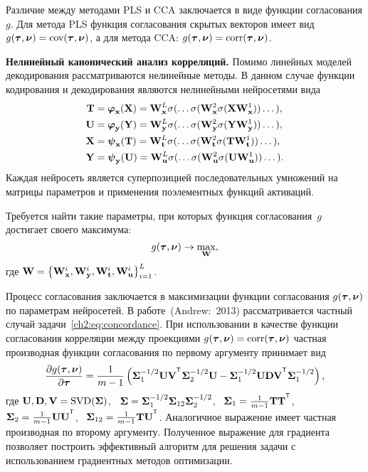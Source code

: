 \documentclass[11pt, a5paper]{dissert}
\begin{document}
Различие между методами PLS и CCA заключается в виде функции согласования $g$.
Для метода PLS функция согласования скрытых векторов имеет вид $g(\boldsymbol{\tau}, \boldsymbol{\nu}) = \text{cov}(\boldsymbol{\tau}, \boldsymbol{\nu})$, а для метода CCA: $g(\boldsymbol{\tau}, \boldsymbol{\nu}) = \text{corr}(\boldsymbol{\tau}, \boldsymbol{\nu})$.

\textbf{Нелинейный канонический анализ корреляций.}
Помимо линейных моделей декодирования рассматриваются нелинейные методы. 
В данном случае функции кодирования и декодирования являются нелинейными нейросетями вида
\begin{align*}
	\mathbf{T} &= \boldsymbol{\varphi}_{\mathbf{x}}(\mathbf{X}) =  \mathbf{W}_{\mathbf{x}}^L \sigma(\dots \sigma(\mathbf{W}_{\mathbf{x}}^2 \sigma(\mathbf{X} \mathbf{W}_{\mathbf{x}}^1)) \dots ), \\
	\mathbf{U} &= \boldsymbol{\varphi}_{\mathbf{y}}(\mathbf{Y}) =  \mathbf{W}_{\mathbf{y}}^L \sigma(\dots \sigma(\mathbf{W}_{\mathbf{y}}^2 \sigma(\mathbf{Y} \mathbf{W}_{\mathbf{y}}^1)) \dots ), \\
	\mathbf{X} &= \boldsymbol{\psi}_{\mathbf{x}}(\mathbf{T}) =  \mathbf{W}_{\mathbf{t}}^L \sigma(\dots \sigma(\mathbf{W}_{\mathbf{t}}^2 \sigma(\mathbf{T} \mathbf{W}_{\mathbf{t}}^1)) \dots ), \\
	\mathbf{Y} &= \boldsymbol{\psi}_{\mathbf{y}}(\mathbf{U}) =  \mathbf{W}_{\mathbf{u}}^L \sigma(\dots \sigma(\mathbf{W}_{\mathbf{u}}^2 \sigma(\mathbf{U} \mathbf{W}_{\mathbf{u}}^1)) \dots ).
\end{align*}
Каждая нейросеть является суперпозицией последовательных умножений на матрицы параметров и применения поэлементных функций активаций.

Требуется найти такие параметры, при которых функция согласования~$g$ достигает своего максимума:
\begin{equation}
	g(\boldsymbol{\tau}, \boldsymbol{\nu}) \rightarrow \max_{\mathbf{W}},
	\label{ch2:eq:concordance}
\end{equation}
где $\mathbf{W} = \bigl\{\mathbf{W}_{\mathbf{x}}^i, \mathbf{W}_{\mathbf{y}}^i, \mathbf{W}_{\mathbf{t}}^i, \mathbf{W}_{\mathbf{u}}^i\bigr\}_{i=1}^L$.

Процесс согласования заключается в максимизации функции согласования $g(\boldsymbol{\tau}, \boldsymbol{\nu})$ по параметрам нейросетей.
В работе~(Andrew:~2013) рассматривается частный случай задачи~\eqref{ch2:eq:concordance}. 
При использовании в качестве функции согласования корреляции между проекциями $g(\boldsymbol{\tau}, \boldsymbol{\nu}) = \textnormal{corr}(\boldsymbol{\tau}, \boldsymbol{\nu})$ частная производная функции согласования по первому аргументу принимает вид
\[
	\frac{\partial g(\btau, \bnu)}{\partial \btau} = \frac{1}{m - 1} \left(\bSigma_1^{-1/2} \bU \bV^{\T} \bSigma_2^{-1/2} \bU - \bSigma_1^{-1/2} \bU \bD \bV^{\T} \bSigma_1^{-1/2} \right),
\]
где $\mathbf{U}, \mathbf{D}, \mathbf{V} = \textnormal{SVD}(\boldsymbol{\Sigma})$, \, $\boldsymbol{\Sigma} = \boldsymbol{\Sigma}_1^{-1/2} \boldsymbol{\Sigma}_{12} \boldsymbol{\Sigma}_2^{-1/2} $, \, $\bSigma_1 = \frac{1}{m - 1} \bT \bT^{\T}$, \, $\bSigma_2 = \frac{1}{m - 1} \bU \bU^{\T}$, \, $\bSigma_{12} = \frac{1}{m - 1} \bT \bU^{\T}$.
Аналогичное выражение имеет частная производная по второму аргументу.
Полученное выражение для градиента позволяет построить эффективный алгоритм для решения задачи с использованием градиентных методов оптимизации.
\end{document}
